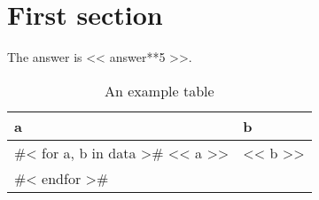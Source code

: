 \documentclass{article}
\begin{document}
\section{First section}

The answer is << answer**5 >>.

\begin{table}
\caption{An example table}
\begin{tabular}{l l}
\toprule
a & b \\
\midrule
#< for a, b in data >#
<< a >> & << b >> \\
#< endfor >#
\bottomrule
\end{tabular}
\end{table}
\end{document}
